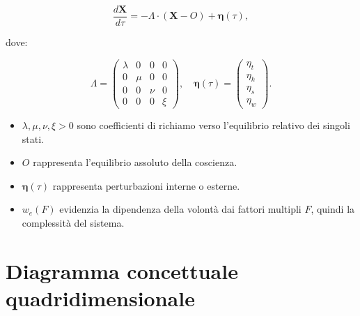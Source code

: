 \documentclass[12pt,a4paper]{article}
\begin{document}
\begin{equation}
\frac{d\mathbf{X}}{d\tau} = - \Lambda \cdot (\mathbf{X} - O) + \mathbf{\eta}(\tau),
\end{equation}

dove:

\[
\Lambda = 
\begin{pmatrix}
\lambda & 0 & 0 & 0 \\
0 & \mu & 0 & 0 \\
0 & 0 & \nu & 0 \\
0 & 0 & 0 & \xi
\end{pmatrix}, 
\quad
\mathbf{\eta}(\tau) =
\begin{pmatrix}
\eta_t \\ \eta_k \\ \eta_s \\ \eta_w
\end{pmatrix}.
\]

\begin{itemize}
    \item $\lambda, \mu, \nu, \xi > 0$ sono coefficienti di richiamo verso l’equilibrio relativo dei singoli stati.
    \item $O$ rappresenta l’equilibrio assoluto della coscienza.
    \item $\mathbf{\eta}(\tau)$ rappresenta perturbazioni interne o esterne.
    \item $w_e(F)$ evidenzia la dipendenza della volontà dai fattori multipli $F$, quindi la complessità del sistema.
\end{itemize}

\section{Diagramma concettuale quadridimensionale}
\end{document}

